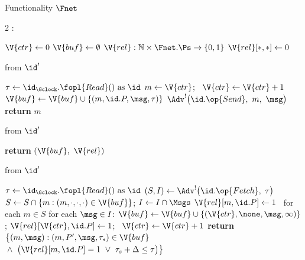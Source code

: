 \begin{interface}[nofloat]{Functionality $\Fnet$ \\
\params{$\PID$, \quad $\Ps$, \quad $\admits$, \quad
$\uses := \{(\Gclock,\serves),\,(\Adv,\serves)\}$, \quad $\pars := \Delta$}}

{\scriptsize
\setlength{\columnsep}{1.4em}
\begin{multicols}{2}
:
\begin{algorithmic}[1]
\setcounter{contline}{0}\algcont
\State $\V{ctr} \gets 0$
\State $\V{buf} \gets \emptyset$
\State $\V{rel} : \mathbb{N} \times \Fnet.\Ps \to \{0,1\}$
\State $\V{rel}[*,*] \gets 0$
\algsave
\end{algorithmic}
\vspace{1.4ex}

 \quad from $\id'$
\begin{algorithmic}[1]
\algcont
\State $\tau \gets \id_{\Gclock}.\fopl{Read}() \text{ as } \id$
\State $m \gets \V{ctr}$; \ $\V{ctr} \gets \V{ctr} + 1$
\State $\V{buf} \gets \V{buf} \cup \{(m, \id.P, \msg, \tau)\}$
\State $\Adv^{!}\bigl(\id.\op{Send},\ m,\ \msg\bigr)$ \label{ln:netsend}
\State \textbf{return} $m$
\algsave
\end{algorithmic}
\vspace{1.4ex}

 \quad from $\id'$
\begin{algorithmic}[1]
\algcont
\State \textbf{return} $(\V{buf},\ \V{rel})$
\algsave
\end{algorithmic}
\vspace{1.4ex}

\columnbreak

 \quad from $\id'$
\begin{algorithmic}[1]
\algcont
\State $\tau \gets \id_{\Gclock}.\fopl{Read}() \text{ as } \id$
\State $(S, I) \gets \Adv^{!}\bigl(\id.\op{Fetch},\ \tau\bigr)$ \label{ln:netquery}
\State $S \gets S \cap \{m : (m,\cdot,\cdot,\cdot) \in \V{buf}\}$;
\State $I \gets I \cap \Msgs$
\State $\V{rel}[m, \id.P] \gets 1$ \ for each $m \in S$
\State for each $\msg \in I$: \label{ln:netinject}
\State \quad $\V{buf} \gets \V{buf} \cup \{(\V{ctr}, \none, \msg, \infty)\}$;
\State \quad $\V{rel}[\V{ctr}, \id.P] \gets 1$; \ $\V{ctr} \gets \V{ctr} + 1$
\State \textbf{return} $\bigl\{(m, \msg) : (m, P', \msg, \tau_s) \in \V{buf}$
\State \quad ${}\wedge\ \bigl(\V{rel}[m, \id.P] = 1 \ \vee\ \tau_s + \Delta \leq \tau\bigr)\bigr\}$ \label{ln:netavail}
\algsave
\end{algorithmic}
\end{multicols}}
\end{interface}
